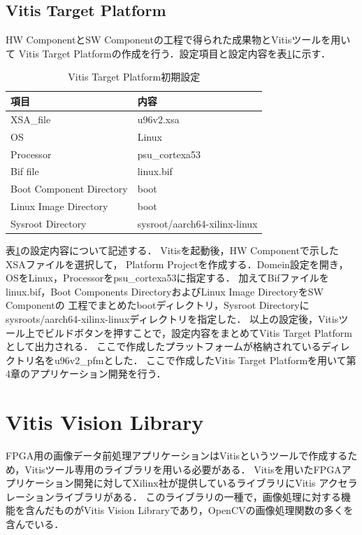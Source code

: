 \documentclass[11pt,a4j]{jreport}
\begin{document}
\subsection{Vitis Target Platform}
HW ComponentとSW Componentの工程で得られた成果物とVitisツールを用いて
Vitis Target Platformの作成を行う．設定項目と設定内容を表\ref{vtpset}に示す．
\begin{table}[H]
  \caption{Vitis Target Platform初期設定}
  \label{vtpset}
  \centering
  \begin{tabular}{ll}
    \hline
    項目 & 内容 \\
    \hline
    XSA_file & u96v2.xsa\\
    OS & Linux \\
    Processor & psu_cortexa53\\
    Bif file & linux.bif \\
    Boot Component Directory & boot \\
    Linux Image Directory & boot \\
    Sysroot Directory & sysroot/aarch64-xilinx-linux \\
    \hline
    \end{tabular}
\end{table}
表\ref{vtpset}の設定内容について記述する．
Vitisを起動後，HW Componentで示したXSAファイルを選択して，
Platform Projectを作成する．Domein設定を開き，OSをLinux，Processorをpsu_cortexa53に指定する．
加えてBifファイルをlinux.bif，Boot Components DirectoryおよびLinux Image DirectoryをSW Componentの
工程でまとめたbootディレクトリ，Sysroot Directoryにsysroots/aarch64-xilinx-linuxディレクトリを指定した．
以上の設定後，Vitisツール上でビルドボタンを押すことで，設定内容をまとめてVitis Target Platformとして出力される．
ここで作成したプラットフォームが格納されているディレクトリ名をu96v2_pfmとした．
ここで作成したVitis Target Platformを用いて第4章のアプリケーション開発を行う．

\section{Vitis Vision Library}
FPGA用の画像データ前処理アプリケーションはVitisというツールで作成するため，Vitisツール専用のライブラリを用いる必要がある．
Vitisを用いたFPGAアプリケーション開発に対してXilinx社が提供しているライブラリにVitis アクセラレーションライブラリがある．
このライブラリの一種で，画像処理に対する機能を含んだものがVitis Vision Libraryであり，OpenCVの画像処理関数の多くを含んでいる．
\end{document}
